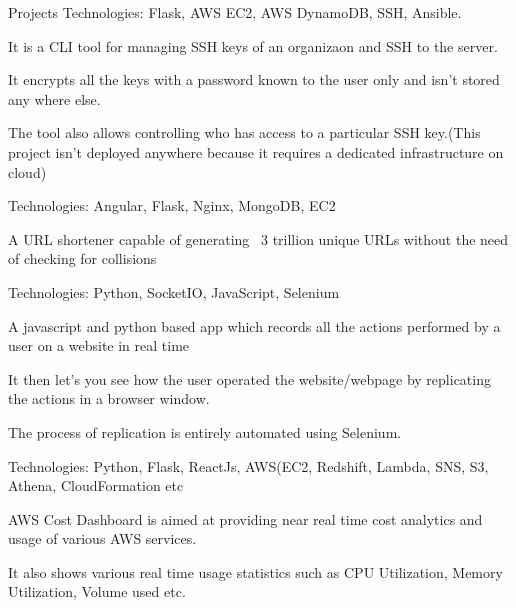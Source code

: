 \documentclass[]{resume-knyte}
\begin{document}
\begin{topic}{Projects}
    {Technologies: Flask, AWS EC2, AWS DynamoDB, SSH, Ansible.}
    {\begin{tightitemize}
        \item It is a CLI tool for managing SSH keys of an organizaon and SSH to the server.
        \item It encrypts all the keys with a password known to the user only and isn’t stored any where else.
        \item The tool also allows controlling who has access to a particular SSH key.(This project isn't deployed anywhere because it requires a dedicated infrastructure on cloud)
    \end{tightitemize}}
    {Technologies: Angular, Flask, Nginx, MongoDB, EC2}
    {\begin{tightitemize}
        \item A URL shortener capable of generating ~3 trillion unique URLs without the need of checking for collisions
    \end{tightitemize}}
    {Technologies: Python, SocketIO, JavaScript, Selenium}
    {\begin{tightitemize}
        \item A javascript and python based app which records all the actions performed by a user on a website in real time \item It then let’s you see how the user operated the website/webpage by replicating the actions in a browser window.
        \item The process of replication is entirely automated using Selenium.
    \end{tightitemize}}
    {Technologies: Python, Flask, ReactJs, AWS(EC2, Redshift, Lambda, SNS, S3, Athena, CloudFormation etc}
    {\begin{tightitemize}
        \item AWS Cost Dashboard is aimed at providing near real time cost analytics and usage of various AWS services.
        \item It also shows various real time usage statistics such as CPU Utilization, Memory Utilization, Volume used etc.
    \end{tightitemize}}
\end{topic}
\end{document}
